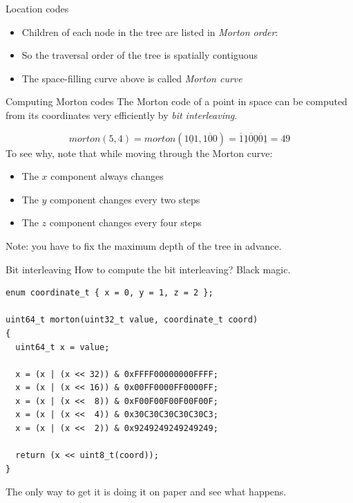 \documentclass[utf8x]{beamer}
\begin{document}
\begin{frame}{Location codes}
\begin{itemize}
\item Children of each node in the tree are listed in \emph{Morton order}:
\end{itemize}
\begin{center}
\end{center}
\begin{itemize}
\item So the traversal order of the tree is spatially contiguous 
\item The space-filling curve above is called \emph{Morton curve} 
      \cite{Morton66}
\end{itemize}
\end{frame}

\begin{frame}{Computing Morton codes}
The Morton code of a point in space can be computed from its coordinates very
efficiently by \emph{bit interleaving}.

\begin{equation}
morton(5,4) = morton(\underline{101}, \overline{100}) = 
\overline{1}
\underline{1}
\overline{0}
\underline{0}
\overline{0}
\underline{1} = 49
\end{equation}
To see why, note that while moving through the Morton curve:
\begin{itemize}
\item The $x$ component always changes
\item The $y$ component changes every two steps
\item The $z$ component changes every four steps
\end{itemize}
Note: you have to fix the maximum depth of the tree in advance.
\end{frame}

\begin{frame}[fragile]{Bit interleaving}
How to compute the bit interleaving? Black magic.
\begin{lstlisting}
enum coordinate_t { x = 0, y = 1, z = 2 };

uint64_t morton(uint32_t value, coordinate_t coord)
{
  uint64_t x = value;
  
  x = (x | (x << 32)) & 0xFFFF00000000FFFF;
  x = (x | (x << 16)) & 0x00FF0000FF0000FF;
  x = (x | (x <<  8)) & 0xF00F00F00F00F00F;
  x = (x | (x <<  4)) & 0x30C30C30C30C30C3;
  x = (x | (x <<  2)) & 0x9249249249249249;
  
  return (x << uint8_t(coord));
}
\end{lstlisting}
The only way to get it is doing it on paper and see what happens.
\end{frame}
\end{document}
